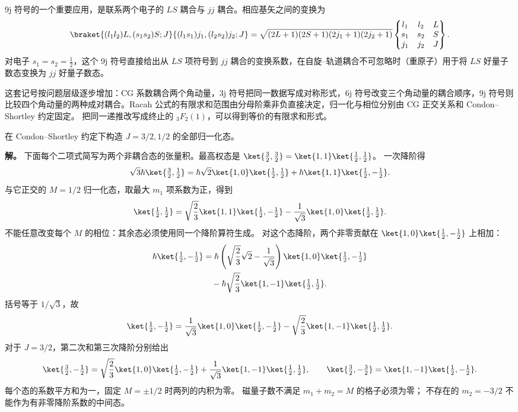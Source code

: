 \medskip
\noindent 9j 符号的一个重要应用，是联系两个电子的 \(LS\) 耦合与 \(jj\) 耦合。相应基矢之间的变换为
\[
\braket{(l_1 l_2)L,(s_1 s_2)S;J}{(l_1 s_1)j_1,(l_2 s_2)j_2;J}
=\sqrt{(2L+1)(2S+1)(2j_1+1)(2j_2+1)}
\begin{Bmatrix}l_1&l_2&L\\s_1&s_2&S\\j_1&j_2&J\end{Bmatrix}.
\]
对电子 $s_1=s_2=\frac12$，这个 9j 符号直接给出从 $LS$ 项符号到 $jj$ 耦合的变换系数，在自旋--轨道耦合不可忽略时（重原子）用于将 $LS$ 好量子数态变换为 $jj$ 好量子数态。
\par\medskip
这套记号按问题层级逐步增加：CG 系数耦合两个角动量，3j 符号把同一数据写成对称形式，6j 符号改变三个角动量的耦合顺序，9j 符号则比较四个角动量的两种成对耦合。Racah 公式的有限求和范围由分母阶乘非负直接决定，归一化与相位分别由 CG 正交关系和 Condon--Shortley 约定固定。
把同一递推改写成终止的 \({}_3F_2(1)\)，可以得到等价的有限求和形式。
\begin{example}
在 Condon--Shortley 约定下构造 $J=3/2,1/2$ 的全部归一化态。

\textbf{解。} 下面每个二项式简写为两个非耦合态的张量积。最高权态是
$\ket{\tfrac32,\tfrac32}=\ket{1,1}\ket{\tfrac12,\tfrac12}$。
一次降阶得
\[
\sqrt3\hbar\ket{\tfrac32,\tfrac12}
=\hbar\sqrt2\ket{1,0}\ket{\tfrac12,\tfrac12}
+\hbar\ket{1,1}\ket{\tfrac12,-\tfrac12}.
\]
与它正交的 $M=1/2$ 归一化态，取最大 $m_1$ 项系数为正，得到
\[
\ket{\tfrac12,\tfrac12}
=\sqrt{\frac23}\ket{1,1}\ket{\tfrac12,-\tfrac12}
-\frac1{\sqrt3}\ket{1,0}\ket{\tfrac12,\tfrac12}.
\]
不能任意改变每个 $M$ 的相位：其余态必须使用同一个降阶算符生成。
对这个态降阶，两个非零贡献在 $\ket{1,0}\ket{\tfrac12,-\tfrac12}$ 上相加：
\begin{align*}
\hbar\ket{\tfrac12,-\tfrac12}
&=\hbar\left(\sqrt{\frac23}\sqrt2-\frac1{\sqrt3}\right)
\ket{1,0}\ket{\tfrac12,-\tfrac12}\\
&\quad-\hbar\sqrt{\frac23}\ket{1,-1}\ket{\tfrac12,\tfrac12}.
\end{align*}
括号等于 $1/\sqrt3$，故
\[
\ket{\tfrac12,-\tfrac12}
=\frac1{\sqrt3}\ket{1,0}\ket{\tfrac12,-\tfrac12}
-\sqrt{\frac23}\ket{1,-1}\ket{\tfrac12,\tfrac12}.
\]
对于 $J=3/2$，第二次和第三次降阶分别给出
\[
\ket{\tfrac32,-\tfrac12}
=\sqrt{\frac23}\ket{1,0}\ket{\tfrac12,-\tfrac12}
+\frac1{\sqrt3}\ket{1,-1}\ket{\tfrac12,\tfrac12},
\qquad
\ket{\tfrac32,-\tfrac32}=\ket{1,-1}\ket{\tfrac12,-\tfrac12}.
\]
每个态的系数平方和为一，固定 $M=\pm1/2$ 时两列的内积为零。
磁量子数不满足 $m_1+m_2=M$ 的格子必须为零；
不存在的 $m_2=-3/2$ 不能作为有非零降阶系数的中间态。
\end{example}

